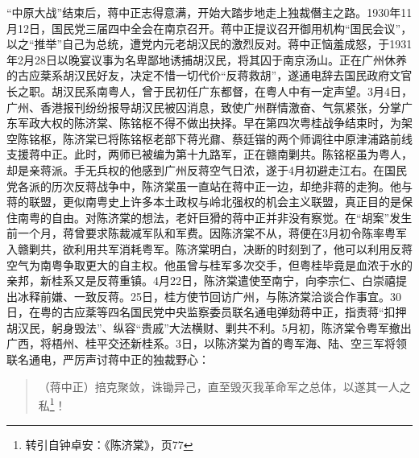 “中原大战”结束后，蒋中正志得意满，开始大踏步地走上独裁僭主之路。1930年11月12日，国民党三届四中全会在南京召开。蒋中正提议召开御用机构“国民会议”，以之“推举”自己为总统，遭党内元老胡汉民的激烈反对。蒋中正恼羞成怒，于1931年2月28日以晚宴议事为名卑鄙地诱捕胡汉民，将其囚于南京汤山。正在广州休养的古应棻系胡汉民好友，决定不惜一切代价“反蒋救胡”，遂通电辞去国民政府文官长之职。胡汉民系南粤人，曾于民初任广东都督，在粤人中有一定声望。3月4日，广州、香港报刊纷纷报导胡汉民被囚消息，致使广州群情激奋、气氛紧张，分掌广东军政大权的陈济棠、陈铭枢不得不做出抉择。早在第四次粤桂战争结束时，为架空陈铭枢，陈济棠已将陈铭枢老部下蒋光鼐、蔡廷锴的两个师调往中原津浦路前线支援蒋中正。此时，两师已被编为第十九路军，正在赣南剿共。陈铭枢虽为粤人，却是亲蒋派。手无兵权的他感到广州反蒋空气日浓，遂于4月初避走江右。在国民党各派的历次反蒋战争中，陈济棠虽一直站在蒋中正一边，却绝非蒋的走狗。他与蒋的联盟，更似南粤史上许多本土政权与岭北强权的机会主义联盟，真正目的是保住南粤的自由。对陈济棠的想法，老奸巨猾的蒋中正并非没有察觉。在“胡案”发生前一个月，蒋曾要求陈裁减军队和军费。因陈济棠不从，蒋便在3月初令陈率粤军入赣剿共，欲利用共军消耗粤军。陈济棠明白，决断的时刻到了，他可以利用反蒋空气为南粤争取更大的自主权。他虽曾与桂军多次交手，但粤桂毕竟是血浓于水的亲邦，新桂系又是反蒋重镇。4月22日，陈济棠遣使至南宁，向李宗仁、白崇禧提出冰释前嫌、一致反蒋。25日，桂方使节回访广州，与陈济棠洽谈合作事宜。30日，在粤的古应棻等四名国民党中央监察委员联名通电弹劾蒋中正，指责蒋“扣押胡汉民，躬身毁法”、纵容“贵戚”大法横财、剿共不利。5月初，陈济棠令粤军撤出广西，将梧州、桂平交还新桂系。3日，以陈济棠为首的粤军海、陆、空三军将领联名通电，严厉声讨蒋中正的独裁野心：

\begin{quote}
（蒋中正）掊克聚敛，诛锄异己，直至毁灭我革命军之总体，以遂其一人之私\footnote{转引自钟卓安：《陈济棠》，页77}！
\end{quote}


